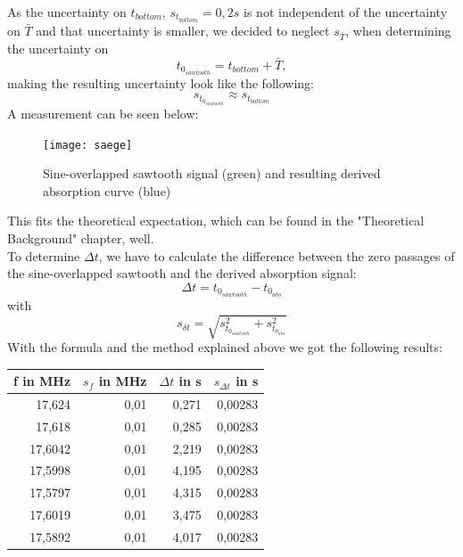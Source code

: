 As the uncertainty on $t_{bottom}$, $s_{t_{bottom}}=0,2 s$ is not independent of the uncertainty on $\bar{T}$ and that uncertainty is smaller, we decided to neglect $s_{\bar{T}}$, when determining the uncertainty on \[t_{0_{sawtooth}}=t_{bottom}+\bar{T},\] making the resulting uncertainty look like the following:\[s_{t_{0_{sawtooth}}}\approx s_{t_{bottom}}\]
\clearpage
A measurement can be seen below:\\
\begin{figure}[htbp]
\begin{center}
\texttt{[image: saege]}
\caption{Sine-overlapped sawtooth signal (green) and resulting derived absorption curve (blue)}
\end{center}
\end{figure}
\clearpage
This fits the theoretical expectation, which can be found in the "Theoretical Background" chapter, well.\\
To determine $\Delta t$, we have to calculate the difference between the zero passages of the sine-overlapped sawtooth and the derived absorption signal: \[\Delta t=t_{0_{sawtooth}}-t_{0_{abs}}\] with\\
 \[s_{\delta t}=\sqrt{s_{t_{0_{sawtooth}}}^{2}+s_{t_{0_{abs}}}^{2}}\]
 With the formula and the method explained above we got the following results:\\
 \begin{table}[htbp]
 \begin{center}
 \begin{tabular}{|r|r|r|r|}
 \hline
 \multicolumn{1}{|l|}{f in MHz} & \multicolumn{1}{l|}{$s_{f}$ in MHz} & \multicolumn{1}{l|}{$\Delta t$ in s} & \multicolumn{1}{l|}{$s_{\Delta t}$ in s} \\ \hline
 17,624 & 0,01 & 0,271 & 0,00283 \\ \hline
 17,618 & 0,01 & 0,285 & 0,00283 \\ \hline
 17,6042 & 0,01 & 2,219 & 0,00283 \\ \hline
 17,5998 & 0,01 & 4,195 & 0,00283 \\ \hline
 17,5797 & 0,01 & 4,315 & 0,00283 \\ \hline
 17,6019 & 0,01 & 3,475 & 0,00283 \\ \hline
 17,5892 & 0,01 & 4,017 & 0,00283 \\ \hline
 \end{tabular}
 \end{center}
 \end{table}
 
